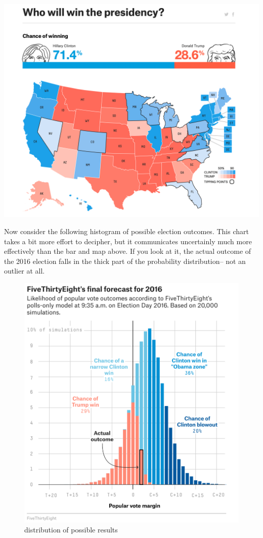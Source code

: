 \documentclass[]{book}
\begin{document}
\includegraphics{images/map.png}

Now consider the following histogram of possible election outcomes. This chart takes a bit more effort to decipher, but it communicates uncertainly much more effectively than the bar and map above. If you look at it, the actual outcome of the 2016 election falls in the thick part of the probability distribution-- not an outlier at all.

\begin{figure}
\centering
\includegraphics{images/uncertain_dist.png}
\caption{distribution of possible results}
\end{figure}
\end{document}
